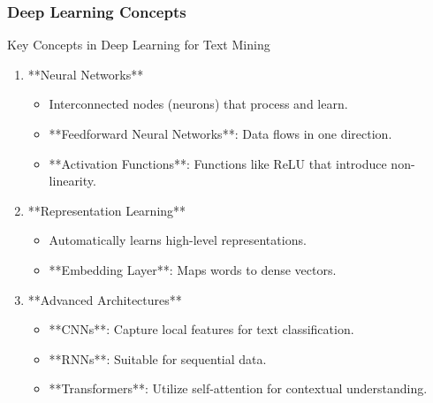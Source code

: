 \documentclass[aspectratio=169]{beamer}
\begin{document}
\begin{frame}[fragile]
    \frametitle{Deep Learning Concepts}
    \begin{block}{Key Concepts in Deep Learning for Text Mining}
        \begin{enumerate}
            \item **Neural Networks**
                \begin{itemize}
                    \item Interconnected nodes (neurons) that process and learn.
                    \item **Feedforward Neural Networks**: Data flows in one direction.
                    \item **Activation Functions**: Functions like ReLU that introduce non-linearity.
                \end{itemize}
            \item **Representation Learning**
                \begin{itemize}
                    \item Automatically learns high-level representations.
                    \item **Embedding Layer**: Maps words to dense vectors.
                \end{itemize}
            \item **Advanced Architectures**
                \begin{itemize}
                    \item **CNNs**: Capture local features for text classification.
                    \item **RNNs**: Suitable for sequential data.
                    \item **Transformers**: Utilize self-attention for contextual understanding.
                \end{itemize}
        \end{enumerate}
    \end{block}
\end{frame}
\end{document}
